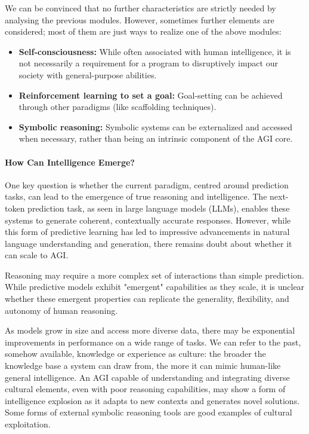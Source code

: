 We can be convinced that no further characteristics are strictly needed by analysing the previous modules. However, sometimes further elements are considered; most of them are just ways to realize one of the above modules:
\begin{itemize}
    \item \textbf{Self-consciousness:} While often associated with human intelligence, it is not necessarily a requirement for a program to disruptively impact our society with general-purpose abilities.
    \item \textbf{Reinforcement learning to set a goal:} Goal-setting can be achieved through other paradigms (like scaffolding techniques).
    \item \textbf{Symbolic reasoning:} Symbolic systems can be externalized and accessed when necessary, rather than being an intrinsic component of the AGI core.
\end{itemize}

\paragraph{How Can Intelligence Emerge?}
One key question is whether the current paradigm, centred around prediction tasks, can lead to the emergence of true reasoning and intelligence. The next-token prediction task, as seen in large language models (LLMs), enables these systems to generate coherent, contextually accurate responses. However, while this form of predictive learning has led to impressive advancements in natural language understanding and generation, there remains doubt about whether it can scale to AGI. 

Reasoning may require a more complex set of interactions than simple prediction. While predictive models exhibit "emergent" capabilities as they scale, it is unclear whether these emergent properties can replicate the generality, flexibility, and autonomy of human reasoning.

As models grow in size and access more diverse data, there may be exponential improvements in performance on a wide range of tasks. We can refer to the past, somehow available, knowledge or experience as culture: the broader the knowledge base a system can draw from, the more it can mimic human-like general intelligence. An AGI capable of understanding and integrating diverse cultural elements, even with poor reasoning capabilities, may show a form of intelligence explosion as it adapts to new contexts and generates novel solutions. Some forms of external symbolic reasoning tools are good examples of cultural exploitation.

